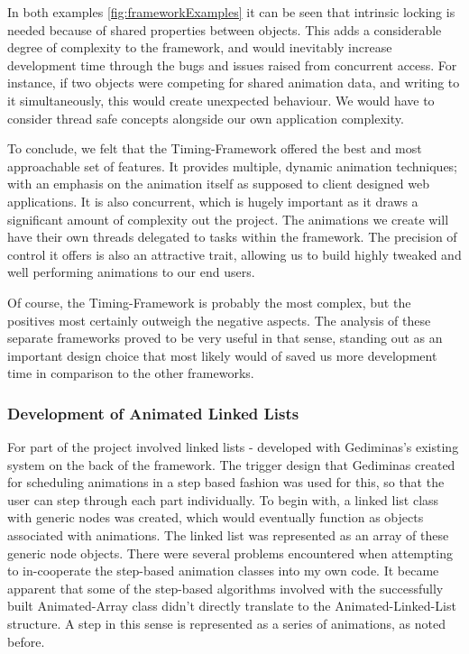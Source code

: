 \documentclass{l3proj}
\begin{document}


In both examples \ref{fig:frameworkExamples} it can be seen that intrinsic locking is needed because of shared properties between objects. This adds a considerable degree of complexity to the framework, and would inevitably increase development time through the bugs and issues raised from concurrent access. For instance, if two objects were competing for shared animation data, and writing to it simultaneously, this would create unexpected behaviour. We would have to consider thread safe concepts alongside our own application complexity.

To conclude, we felt that the Timing-Framework offered the best and most approachable set of features. It provides multiple, dynamic animation techniques; with an emphasis on the animation itself as supposed to client designed web applications. It is also concurrent, which is hugely important as it draws a significant amount of complexity out the project. The animations we create will have their own threads delegated to tasks within the framework. The precision of control it offers is also an attractive trait, allowing us to build highly tweaked and well performing animations to our end users. 

Of course, the Timing-Framework is probably the most complex, but the positives most certainly outweigh the negative aspects. The analysis of these separate frameworks proved to be very useful in that sense, standing out as an important design choice that most likely would of saved us more development time in comparison to the other frameworks.

\subsubsection{Development of Animated Linked Lists}

For part of the project involved linked lists - developed with Gediminas’s existing system on the back of the framework. The trigger design that Gediminas created for scheduling animations in a step based fashion was used for this, so that the user can step through each part individually. To begin with, a linked list class with generic nodes was created, which would eventually function as objects associated with animations. The linked list was represented as an array of these generic node objects. There were several problems encountered when attempting to in-cooperate the step-based animation classes into my own code. It became apparent that some of the step-based algorithms involved with the successfully built Animated-Array class didn’t directly translate to the Animated-Linked-List structure. A step in this sense is represented as a series of animations, as noted before.
\end{document}
